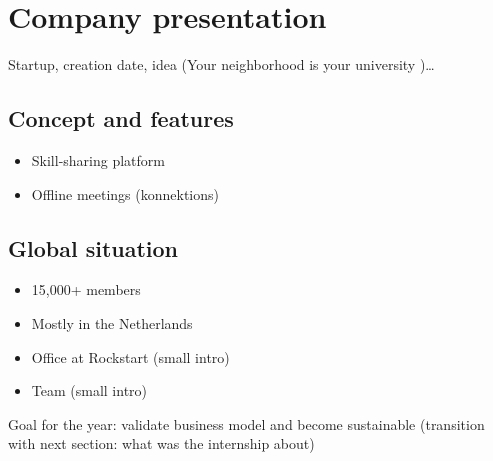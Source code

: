 \section{Company presentation}
\label{sec:company}

Startup, creation date, idea (\guillemotleft Your neighborhood is your university \guillemotright)\ldots

\subsection{Concept and features}
\label{ssec:concept}

\begin{itemize}
\item Skill-sharing platform
\item Offline meetings (konnektions)
\end{itemize}

\subsection{Global situation}
\label{ssec:situation}

\begin{itemize}
\item 15,000+ members
\item Mostly in the Netherlands
\item Office at Rockstart (small intro)
\item Team (small intro)
\end{itemize}

Goal for the year: validate business model and become sustainable (transition with next section: what was the internship about)
